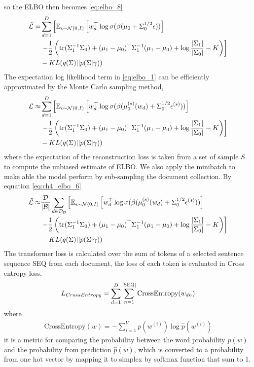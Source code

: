 so the ELBO then becomes \ref{eq:elbo_8}
\begin{align}\label{eq:elbo_8}
\tilde{\mathcal{L}}=&\sum_{d=1}^{D}\left[\mathbb{E}_{\epsilon\sim\mathcal{N}(0,I)}\left[w_d^\top\log\sigma(\beta(\mu_0+\Sigma_0^{1/2}\epsilon))\right]\right.\notag\\
&\left.-\frac{1}{2}\left(\text{tr}(\Sigma_1^{-1}\Sigma_0)+(\mu_1-\mu_0)^\top\Sigma_1^{-1}(\mu_1-\mu_0)+\log\frac{|\Sigma_1|}{|\Sigma_0|}-K\right)\right]\notag\\
&-KL(q(\Sigma)||p(\Sigma|\gamma))
\end{align}
The expectation log likelihood term in \ref{eq:elbo_1} can be efficiently approximated by the Monte Carlo sampling method,
\begin{align}\label{eq:elbo_2}
\mathcal{L}\approx&\sum_{d=1}^{D}\left[\mathbb{E}_{\epsilon\sim\mathcal{N}(0,I)}\left[w_d^\top\log\sigma(\beta(\mu_0^{(s)}(w_d)+\Sigma_0^{1/2}\epsilon^{(s)}))\right]\right.\notag\\
&\left.-\frac{1}{2}\left(\text{tr}(\Sigma_1^{-1}\Sigma_0)+(\mu_1-\mu_0)^\top\Sigma_1^{-1}(\mu_1-\mu_0)+\log\frac{|\Sigma_1|}{|\Sigma_0|}-K\right)\right]\notag\\
&-KL(q(\Sigma)||p(\Sigma|\gamma))
\end{align}
where the expectation of the reconstruction loss is taken from a set of sample $ S $ to compute the unbiased estimate of ELBO. We also apply the minibatch to make able the model perform by sub-sampling the document collection. By equation \ref{eq:ch4_elbo_6}
\begin{align}\label{eq:ch4_elbo_6}
\tilde{\mathcal{L}}\approx&\frac{\mathcal{D}}{|\mathcal{B}|}\sum_{d\in\mathcal{D_B}}\left[\mathbb{E}_{\epsilon\sim\mathcal{N}(0,I)}\left[w_d^\top\log\sigma(\beta(\mu_0^{(s)}(w_d)+\Sigma_0^{1/2}\epsilon^{(s)}))\right]\right.\notag\\
&\left.-\frac{1}{2}\left(\text{tr}(\Sigma_1^{-1}\Sigma_0)+(\mu_1-\mu_0)^\top\Sigma_1^{-1}(\mu_1-\mu_0)+\log\frac{|\Sigma_1|}{|\Sigma_0|}-K\right)\right]\notag\\
&-KL(q(\Sigma)||p(\Sigma|\gamma))
\end{align}
The transformer loss is calculated over the sum of tokens of a selected sentence sequence \textsc{SEQ} from each document, the loss of each token is evaluated in Cross entropy loss.
\begin{equation}\label{ch4:eq_cross_entropy}
L_{CrossEntropy}=\sum_{d=1}^{D}\sum_{n=1}^{|\textsc{SEQ}|}\text{CrossEntropy}(w_{dn})
\end{equation}
where
\begin{align}
\text{CrossEntropy}(w) = -\sum_{i=1}^{V}p(w^{(i)})\log \hat{p}(w^{(i)})
\end{align}
it is a metric for comparing the probability between the word probability $ p(w) $ and the probability from prediction $ \hat{p}(w) $, which is converted to a probability from one hot vector by mapping it to simplex by softmax function that sum to 1.
